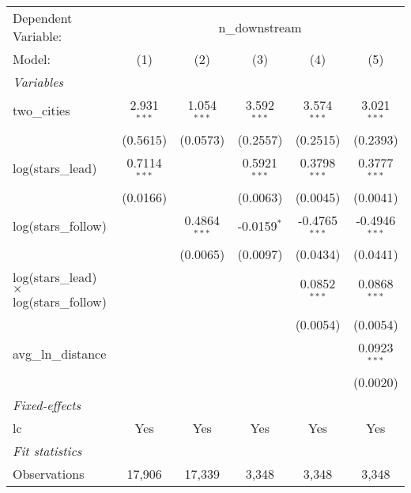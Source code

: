 
\begingroup
\centering
\begin{tabular}{lccccc}
   \tabularnewline \midrule \midrule
   Dependent Variable: & \multicolumn{5}{c}{n\_downstream}\\
   Model:                                          & (1)            & (2)            & (3)            & (4)             & (5)\\  
   \midrule
   \emph{Variables}\\
   two\_cities                                     & 2.931$^{***}$  & 1.054$^{***}$  & 3.592$^{***}$  & 3.574$^{***}$   & 3.021$^{***}$\\   
                                                   & (0.5615)       & (0.0573)       & (0.2557)       & (0.2515)        & (0.2393)\\   
   log(stars\_lead)                                & 0.7114$^{***}$ &                & 0.5921$^{***}$ & 0.3798$^{***}$  & 0.3777$^{***}$\\   
                                                   & (0.0166)       &                & (0.0063)       & (0.0045)        & (0.0041)\\   
   log(stars\_follow)                              &                & 0.4864$^{***}$ & -0.0159$^{*}$  & -0.4765$^{***}$ & -0.4946$^{***}$\\   
                                                   &                & (0.0065)       & (0.0097)       & (0.0434)        & (0.0441)\\   
   log(stars\_lead) $\times$ log(stars\_follow)    &                &                &                & 0.0852$^{***}$  & 0.0868$^{***}$\\   
                                                   &                &                &                & (0.0054)        & (0.0054)\\   
   avg\_ln\_distance                               &                &                &                &                 & 0.0923$^{***}$\\   
                                                   &                &                &                &                 & (0.0020)\\   
   \midrule
   \emph{Fixed-effects}\\
   lc                                              & Yes            & Yes            & Yes            & Yes             & Yes\\  
   \midrule
   \emph{Fit statistics}\\
   Observations                                    & 17,906         & 17,339         & 3,348          & 3,348           & 3,348\\  

\end{tabular}

